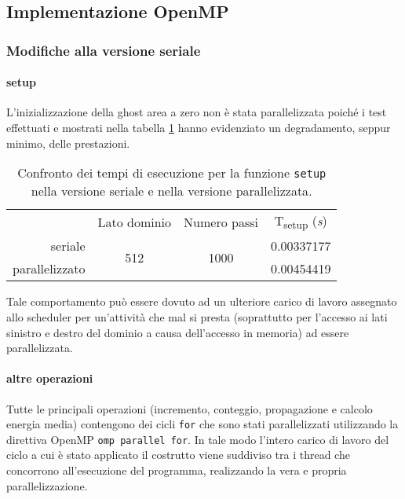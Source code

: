 \subsection{Implementazione OpenMP}

\subsubsection{Modifiche alla versione seriale}

\paragraph{setup}L'inizializzazione della ghost area a zero non è stata
parallelizzata poiché i test effettuati e mostrati nella tabella
\ref{tab:parallelghostarea} hanno evidenziato un degradamento, seppur minimo,
delle prestazioni.

\begin{table}[ht]
\centering
\begin{tabular}{rccc}
\cmidrule[\heavyrulewidth]{2-4}
 & Lato dominio & Numero passi & T\textsubscript{setup} (\textit{s})\\
 \cmidrule[\lightrulewidth]{2-4}
 seriale & \multirow{2}{*}{512} & \multirow{2}{*}{1000} & 0.00337177\\
 parallelizzato &&& 0.00454419\\
\cmidrule[\heavyrulewidth]{2-4}
\end{tabular}
\caption{\label{tab:parallelghostarea}Confronto dei tempi di esecuzione per la
funzione \texttt{setup} nella versione seriale e nella versione parallelizzata.}
\end{table}

Tale comportamento può essere dovuto ad un ulteriore carico di lavoro assegnato
allo scheduler per un'attività che mal si presta (soprattutto per l'accesso ai
lati sinistro e destro del dominio a causa dell'accesso in memoria) ad essere
parallelizzata.

\paragraph{altre operazioni}
Tutte le principali operazioni (incremento, conteggio, propagazione e calcolo
energia media) contengono dei cicli \texttt{for} che sono stati parallelizzati
utilizzando la direttiva OpenMP \texttt{omp parallel for}.  In tale modo
l'intero carico di lavoro del ciclo a cui è stato applicato il costrutto viene
suddiviso tra i thread che concorrono all'esecuzione del programma, realizzando
la vera e propria parallelizzazione.

